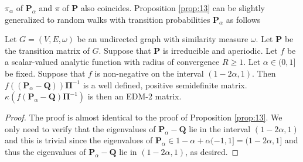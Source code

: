 $\pi_{\alpha}$ of $\mathbf{P}_{\alpha}$ and $\pi$ of $\mathbf{P}$ also
coincides. Proposition \ref{prop:13} can be slightly 
generalized to random walks with transition probabilities
$\mathbf{P}_{\alpha}$ as follows
\begin{proposition}
  \label{prop:24}
  Let $G = (V,E,\omega)$ be an undirected graph with similarity
  measure $\omega$. Let $\mathbf{P}$ be the transition matrix of
  $G$. Suppose that $\mathbf{P}$ is irreducible and aperiodic.  Let
  $f$ be a scalar-valued analytic function with radius of convergence
  $R \geq 1$. Let $\alpha \in (0,1]$ be fixed. Suppose that $f$ is
  non-negative on the interval $(1 - 2\alpha,1)$. Then $f((\mathbf{P}_{\alpha}
  - \mathbf{Q}))\bm{\Pi}^{-1}$ is a well defined, positive
  semidefinite matrix. $\kappa(f(\mathbf{P}_{\alpha} -
  \mathbf{Q})\bm{\Pi}^{-1})$ is then an EDM-2 matrix.
\end{proposition}
\begin{proof}
  The proof is almost identical to the proof of Proposition \ref{prop:13}. We
  only need to verify that the eigenvalues of $\mathbf{P}_{\alpha} - \mathbf{Q}$
  lie in the interval $(1 - 2\alpha, 1)$ and this is trivial since
  the eigenvalues of $\mathbf{P}_{\alpha} \in 1 - \alpha +
  \alpha(-1,1] = (1 - 2\alpha, 1]$ and thus the eigenvalues of
  $\mathbf{P}_{\alpha} - \mathbf{Q}$ lie in $(1 - 2\alpha, 1)$, as desired.
\end{proof}

